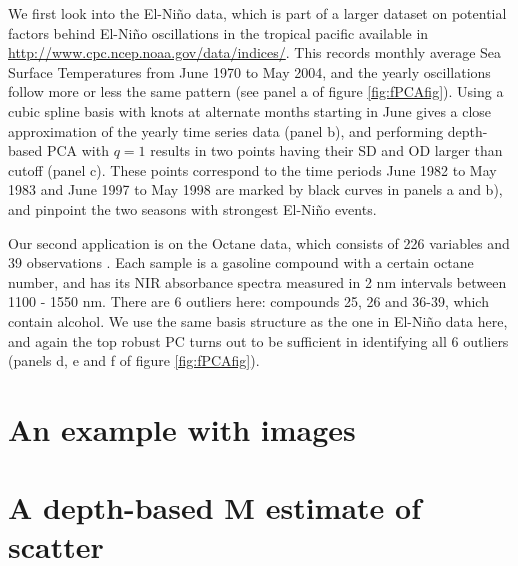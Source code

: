 \documentclass[12pt,letterpaper]{article}
\theoremstyle{definition} \newtheorem{Definition}[Theorem]{Definition}
\begin{document}
We first look into the El-Ni\~no data, which is part of a larger dataset on potential factors behind El-Ni\~no oscillations in the tropical pacific available in \url{http://www.cpc.ncep.noaa.gov/data/indices/}. This records monthly average Sea Surface Temperatures from June 1970 to May 2004, and the yearly oscillations follow more or less the same pattern (see panel a of figure \ref{fig:fPCAfig}). Using a cubic spline basis with knots at alternate months starting in June gives a close approximation of the yearly time series data (panel b), and performing depth-based PCA with $q=1$ results in two points having their SD and OD larger than cutoff (panel c). These points correspond to the time periods June 1982 to May 1983 and June 1997 to May 1998 are marked by black curves in panels a and b), and pinpoint the two seasons with strongest El-Ni\~no events.

Our second application is on the Octane data, which consists of 226 variables and 39 observations \citep{esbensen94}. Each sample is a gasoline compound with a certain octane number, and has its NIR absorbance spectra measured in 2 nm intervals between 1100 - 1550 nm. There are 6 outliers here: compounds 25, 26 and 36-39, which contain alcohol. We use the same basis structure as the one in El-Ni\~no data here, and again the top robust PC turns out to be sufficient in identifying all 6 outliers (panels d, e and f of figure \ref{fig:fPCAfig}).

\section{An example with images}

\section{A depth-based M estimate of scatter}
\end{document}

